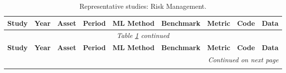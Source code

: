 \begin{longtable}{@{}p{2.4cm} c p{1.0cm} p{1.0cm} p{2.0cm} p{1.9cm} p{1.4cm} c p{1.4cm}@{}}
\caption{Representative studies: Risk Management.}\label{tab:master_risk} \\
\toprule
\textbf{Study} & \textbf{Year} & \textbf{Asset} & \textbf{Period} & \textbf{ML Method} & \textbf{Benchmark} & \textbf{Metric} & \textbf{Code} & \textbf{Data} \\
\midrule
\endfirsthead
\multicolumn{9}{c}{\textit{Table \ref{tab:master_risk} continued}} \\
\toprule
\textbf{Study} & \textbf{Year} & \textbf{Asset} & \textbf{Period} & \textbf{ML Method} & \textbf{Benchmark} & \textbf{Metric} & \textbf{Code} & \textbf{Data} \\
\midrule
\endhead
\midrule
\multicolumn{9}{r}{\textit{Continued on next page}} \\
\endfoot
\bottomrule
\endlastfoot


\end{longtable}
